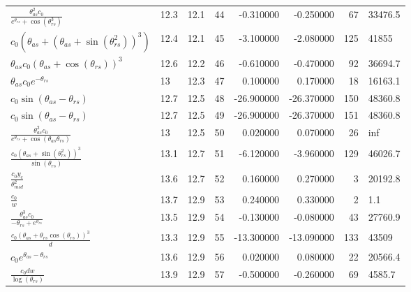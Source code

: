 \begin{tabularx}{\textwidth}{lllrrrrl}
$ \displaystyle\frac{\theta_{as}^{2} c_{0}}{e^{\theta_{rs}} + \cos{\left(\theta_{rs}^{3} \right)}} $  &  12.3  &  12.1  &  44  &  -0.310000  &  -0.250000  &  67  &  33476.5  \\ 
$ c_{0} \left(\theta_{as} + \left(\theta_{as} + \sin{\left(\theta_{rs}^{2} \right)}\right)^{3}\right) $  &  12.4  &  12.1  &  45  &  -3.100000  &  -2.080000  &  125  &  41855\phantom{.0}  \\ 
$ \theta_{as} c_{0} \left(\theta_{as} + \cos{\left(\theta_{rs} \right)}\right)^{3} $  &  12.6  &  12.2  &  46  &  -0.610000  &  -0.470000  &  92  &  36694.7  \\ 
$ \theta_{as} c_{0} e^{- \theta_{rs}} $  &  13\phantom{.0}  &  12.3  &  47  &  0.100000  &  0.170000  &  18  &  16163.1  \\ 
$ c_{0} \sin{\left(\theta_{as} - \theta_{rs} \right)} $  &  12.7  &  12.5  &  48  &  -26.900000  &  -26.370000  &  150  &  48360.8  \\ 
$ c_{0} \sin{\left(\theta_{as} - \theta_{rs} \right)} $  &  12.7  &  12.5  &  49  &  -26.900000  &  -26.370000  &  151  &  48360.8  \\ 
$ \displaystyle\frac{\theta_{as}^{2} c_{0}}{e^{\theta_{rs}} + \cos{\left(\theta_{as} \theta_{rs} \right)}} $  &  13\phantom{.0}  &  12.5  &  50  &  0.020000  &  0.070000  &  26  &  inf  \\ 
$ \displaystyle\frac{c_{0} \left(\theta_{as} + \sin{\left(\theta_{rs}^{2} \right)}\right)^{3}}{\sin{\left(\theta_{rs} \right)}} $  &  13.1  &  12.7  &  51  &  -6.120000  &  -3.960000  &  129  &  46026.7  \\ 
$ \displaystyle\frac{c_{0} y_c}{\theta_{mid}^{2}} $  &  13.6  &  12.7  &  52  &  0.160000  &  0.270000  &  3  &  20192.8  \\ 
$ \displaystyle\frac{c_{0}}{w} $  &  13.7  &  12.9  &  53  &  0.240000  &  0.330000  &  2  &  1.1  \\ 
$ \displaystyle\frac{\theta_{as}^{3} c_{0}}{- \theta_{rs} + e^{\theta_{rs}}} $  &  13.5  &  12.9  &  54  &  -0.130000  &  -0.080000  &  43  &  27760.9  \\ 
$ \displaystyle\frac{c_{0} \left(\theta_{as} + \theta_{rs} \cos{\left(\theta_{rs} \right)}\right)^{3}}{d} $  &  13.3  &  12.9  &  55  &  -13.300000  &  -13.090000  &  133  &  43509\phantom{.0}  \\ 
$ c_{0} e^{\theta_{as} - \theta_{rs}} $  &  13.6  &  12.9  &  56  &  0.020000  &  0.080000  &  22  &  20566.4  \\ 
$ \displaystyle\frac{c_{0} d w}{\log{\left(\theta_{rs} \right)}} $  &  13.9  &  12.9  &  57  &  -0.500000  &  -0.260000  &  69  &  4585.7  \\ 

\end{tabularx}
